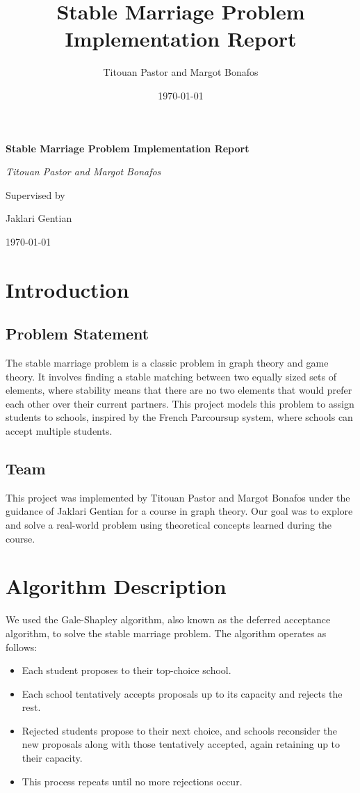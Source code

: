\documentclass{article}
\title{Stable Marriage Problem Implementation Report}
\author{Titouan Pastor and Margot Bonafos}
\date{\today}
\begin{document}
\begin{titlepage}
    \centering
    \vspace*{1in}
    {\huge\bfseries Stable Marriage Problem Implementation Report\par}
    \vspace{1.5in}
    {\Large\itshape Titouan Pastor and Margot Bonafos\par}
    \vfill
    Supervised by\par
    Jaklari Gentian\par
    \vfill
    {\large \today\par}
\end{titlepage}

\tableofcontents
\newpage

\section{Introduction}

\subsection{Problem Statement}
The stable marriage problem is a classic problem in graph theory and game theory. It involves finding a stable matching between two equally sized sets of elements, where stability means that there are no two elements that would prefer each other over their current partners. This project models this problem to assign students to schools, inspired by the French Parcoursup system, where schools can accept multiple students.

\subsection{Team}
This project was implemented by Titouan Pastor and Margot Bonafos under the guidance of Jaklari Gentian for a course in graph theory. Our goal was to explore and solve a real-world problem using theoretical concepts learned during the course.

\section{Algorithm Description}
We used the Gale-Shapley algorithm, also known as the deferred acceptance algorithm, to solve the stable marriage problem. The algorithm operates as follows:

\begin{itemize}
    \item Each student proposes to their top-choice school.
    \item Each school tentatively accepts proposals up to its capacity and rejects the rest.
    \item Rejected students propose to their next choice, and schools reconsider the new proposals along with those tentatively accepted, again retaining up to their capacity.
    \item This process repeats until no more rejections occur.
\end{itemize}
\end{document}
